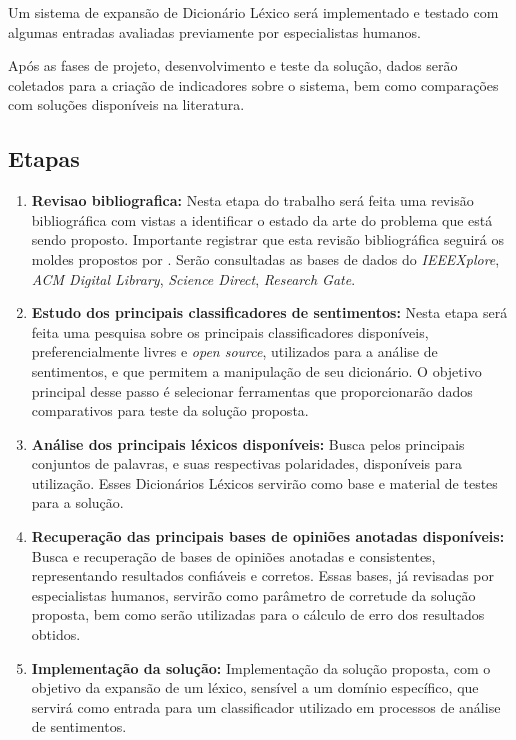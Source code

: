 \documentclass[a4paper,11pt]{article}
\begin{document}
Um sistema de expansão de Dicionário Léxico será implementado e testado com algumas entradas avaliadas previamente por especialistas humanos.

Após as fases de projeto, desenvolvimento e teste da solução, dados serão coletados para a criação de indicadores sobre o sistema, bem como comparações com soluções disponíveis na literatura.

\subsection{Etapas}
\begin{enumerate}[D1.]
\item{\textbf{Revisao bibliografica:} Nesta etapa do trabalho será feita uma revisão bibliográfica com vistas a identificar o estado da arte do problema que está sendo proposto. Importante registrar que esta revisão bibliográfica seguirá os moldes propostos por \cite{Kitchenham2004}}. Serão consultadas as bases de dados do \emph{IEEEXplore}, \emph{ACM Digital Library}, \emph{Science Direct}, \emph{Research Gate}.

\item{\textbf{Estudo dos principais classificadores de sentimentos:}}
Nesta etapa será feita uma pesquisa sobre os principais classificadores disponíveis, preferencialmente livres e \emph{open source}, utilizados para a análise de sentimentos, e que permitem a manipulação de seu dicionário. O objetivo principal desse passo é selecionar ferramentas que proporcionarão dados comparativos para teste da solução proposta.

\item{\textbf{Análise dos principais léxicos disponíveis:}}
Busca pelos principais conjuntos de palavras, e suas respectivas polaridades, disponíveis para utilização. Esses Dicionários Léxicos servirão como base e material de testes para a solução.

\item{\textbf{Recuperação das principais bases de opiniões anotadas disponíveis:}}
Busca e recuperação de bases de opiniões anotadas e consistentes, representando resultados confiáveis e corretos. Essas bases, já revisadas por especialistas humanos, servirão como parâmetro de corretude da solução proposta, bem como serão utilizadas para o cálculo de erro dos resultados obtidos.

\item{\textbf{Implementação da solução:}}
Implementação da solução proposta, com o objetivo da expansão de um léxico, sensível a um domínio específico, que servirá como entrada para um classificador utilizado em processos de análise de sentimentos.


\end{enumerate}
\end{document}
